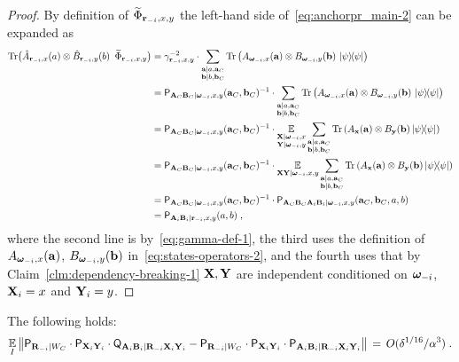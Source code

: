 \begin{proof}
By definition of $\wt{\Phi}_{\ssxy}$ the left-hand side of~\eqref{eq:anchorpr_main-2} can be expanded as
\begin{align*}
\Tr \big ( \what{A}_{\br_\mi, x}(a) \otimes \what{B}_{\br_\mi, y}(b) \,\,\,\wt{\Phi}_{\ssxy} \big )	&= \gamma_\ssxy^{-2} \cdot \sum_{\substack{\ba | a, \ba_C \\ \bb | b, \bb_C}}  \Tr \left ( A_{\bomega_\mi,x}(\ba) \otimes B_{\bomega_\mi,y}(\bb) \,\, \ketbra{\psi}{\psi} \right ) \notag \\
	&= \P_{\bA_C \bB_C|\bomega_\mi, x, y}(\ba_C,\bb_C)^{-1} \cdot \sum_{\substack{\ba | a, \ba_C \\ \bb | b, \bb_C}}  \Tr \left ( A_{\bomega_\mi,x}(\ba) \otimes B_{\bomega_\mi,y}(\bb) \,\, \ketbra{\psi}{\psi} \right ) \notag \\
	&= 	\P_{\bA_C \bB_C|\bomega_\mi, x,y}(\ba_C,\bb_C)^{-1} \cdot \Ex_{\substack{\bX| \bomega_\mi, x \\ \bY| \bomega_\mi ,y}} \sum_{\substack{\ba | a, \ba_C \\ \bb | b, \bb_C}}  \Tr \left ( A_{\bx}(\ba) \otimes B_{\by}(\bb) \, \ketbra{\psi}{\psi} \right )\notag \\
	&= 	\P_{\bA_C \bB_C|\bomega_\mi, x, y}(\ba_C,\bb_C)^{-1} \cdot \Ex_{\bX \bY | \bomega_\mi ,x, y} \sum_{\substack{\ba | a, \ba_C \\ \bb | b, \bb_C}}  \Tr \left ( A_{\bx}(\ba) \otimes B_{\by}(\bb) \, \ketbra{\psi}{\psi} \right ) \notag \\	
	&= \P_{\bA_C \bB_C|\bomega_\mi ,x,y}(\ba_C,\bb_C)^{-1} \cdot \P_{\bA_C\bB_C\bA_i \bB_i | \bomega_\mi,x,y}(\ba_C,\bb_C,a,b) \notag \\
	&= \P_{\bA_i \bB_i | \br_\mi,x,y}(a,b)\;,\notag
\end{align*}
where the second line is by~\eqref{eq:gamma-def-1}, the third uses the definition  of $A_{\bomega_\mi,x}(\ba)$, $B_{\bomega_\mi,y}(\bb)$ in~\eqref{eq:states-operators-2}, and the fourth uses that by Claim~\ref{clm:dependency-breaking-1} $\bX, \bY$ are independent conditioned on $\bomega_\mi$, $\bX_i = x$ and $\bY_i = y$.
\end{proof}

\begin{claim}\label{claim:main-2}
The following holds:
\begin{equation}\label{eq:main-2-0}
\Ex_I \big\| \P_{\bR_\mi |W_C} \cdot \P_{\bX_i \bY_i} \cdot \Qsf_{\bA_i \bB_i |\bR_\mi \bX_i \bY_i } 
	-  \P_{\bR_\mi |W_C} \cdot \P_{\bX_i \bY_i} \cdot \P_{\bA_i \bB_i | \bR_\mi \bX_i \bY_i} \big \|  
\,=\,O(\delta^{1/16}/\alpha^3)\;.
\end{equation}
\end{claim}

